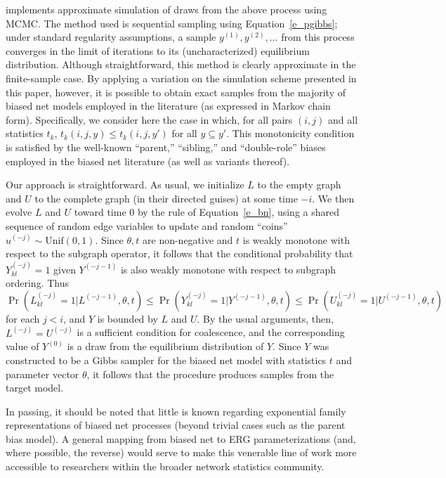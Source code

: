 \documentclass[11pt]{article}
\begin{document}
\citet{butts:sw:2000} implements approximate simulation of draws from the above process using MCMC.  The method used is sequential sampling using Equation~\ref{e_pgibbs}; under standard regularity assumptions, a sample $y^{(1)},y^{(2)},\ldots$ from this process converges in the limit of iterations to its (uncharacterized) equilibrium distribution.  Although straightforward, this method is clearly approximate in the finite-sample case.  By applying a variation on the simulation scheme presented in this paper, however, it is possible to obtain exact samples from the majority of biased net models employed in the literature (as expressed in Markov chain form).  Specifically, we consider here the case in which, for all pairs $(i,j)$ and all statistics $t_k$, $t_k(i,j,y)\le t_k(i,j,y')$ for all $y \subseteq y'$. This monotonicity condition is satisfied by the well-known ``parent,'' ``sibling,'' and ``double-role'' biases employed in the biased net literature (as well as variants thereof).

Our approach is straightforward.  As usual, we initialize $L$ to the empty graph and $U$ to the complete graph (in their directed guises) at some time $-i$.  We then evolve $L$ and $U$ toward time 0 by the rule of Equation~\ref{e_bn}, using a shared sequence of random edge variables to update and random ``coins'' $u^{(-j)} \sim \mathrm{Unif}(0,1)$.  Since $\theta, t$ are non-negative and $t$ is weakly monotone with respect to the subgraph operator, it follows that the conditional probability that $Y^{(-j)}_{kl}=1$ given $Y^{(-j-1)}$ is also weakly monotone with respect to subgraph ordering.  Thus $\Pr\left(L^{(-j)}_{kl}=1|L^{(-j-1)},\theta,t\right)\le\Pr\left(Y^{(-j)}_{kl}=1|Y^{(-j-1)},\theta,t\right)\le\Pr\left(U^{(-j)}_{kl}=1|U^{(-j-1)},\theta,t\right)$ for each $j<i$, and $Y$ is bounded by $L$ and $U$.  By the usual arguments, then, $L^{(-j)}=U^{(-j)}$ is a sufficient condition for coalescence, and the corresponding value of $Y^{(0)}$ is a draw from the equilibrium distribution of $Y$.  Since $Y$ was constructed to be a Gibbs sampler for the biased net model with statistics $t$ and parameter vector $\theta$, it follows that the procedure produces samples from the target model.

In passing, it should be noted that little is known regarding exponential family representations of biased net processes (beyond trivial cases such as the parent bias model).  A general mapping from biased net to ERG parameterizations (and, where possible, the reverse) would serve to make this venerable line of work more accessible to researchers within the broader network statistics community.
\end{document}
